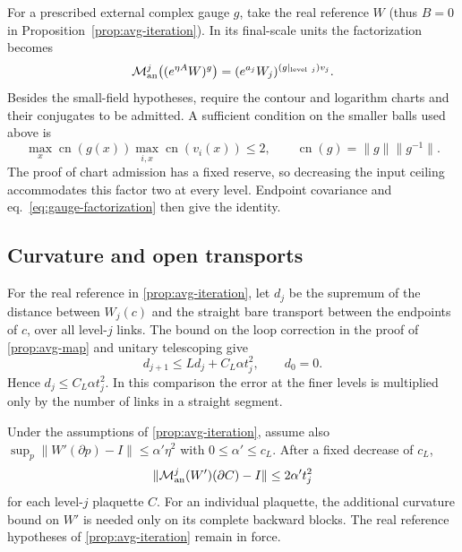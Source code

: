 \documentclass[11pt,letterpaper,reqno]{amsart}
\makeatletter
\numberwithin{equation}{section}
\renewcommand{\eqref}[1]{\textup{eq.~\ref{#1}}}
\theoremstyle{definition}
\newcommand{\ms@minorstart}{%
  \pushQED{\qed}\renewcommand{\qedsymbol}{$\blacksquare$}}
\newenvironment{proposition}[1][]{\ms@minorstart\ms@proposition[#1]}
  {\popQED\endms@proposition}
\theoremstyle{remark}
\makeatother
\begin{document}
For a prescribed external complex gauge $g$, take the real reference
$W$ (thus $B=0$ in Proposition~\ref{prop:avg-iteration}). In its
final-scale units the factorization becomes
\begin{equation}\label{eq:avg-external-gauge}
 \mathcal M_{\rm an}^j\bigl((e^{\eta A}W)^g\bigr)
       =(e^{a_j}W_j)^{(g|_{\mathrm{level}\ j})v_j}.
\end{equation}
Besides the small-field hypotheses, require the contour and logarithm
charts and their conjugates to be admitted. A sufficient condition on
the smaller balls used above is
\[
 \max_x\operatorname{cn}(g(x))\max_{i,x}\operatorname{cn}(v_i(x))\le2,
 \qquad \operatorname{cn}(g)=\|g\|\|g^{-1}\|.
\]
The proof of chart admission has a fixed reserve, so decreasing the
input ceiling accommodates this factor two at every level. Endpoint
covariance and \eqref{eq:gauge-factorization} then give the identity.

\subsection{Curvature and open transports}

For the real reference in \cref{prop:avg-iteration}, let \(d_j\) be
the supremum of the distance between \(W_j(c)\) and the straight
bare transport between the endpoints of \(c\), over all level-\(j\)
links. The bound on the loop correction in the proof of
\cref{prop:avg-map} and unitary telescoping give
\[
 d_{j+1}\leq Ld_j+C_L\alpha t_j^2,\qquad d_0=0.
\]
Hence \(d_j\leq C_L\alpha t_j^2\). In this comparison the error
at the finer levels is multiplied only by the number of links
in a straight segment.

\begin{proposition}[Complex curvature at its own scale]\label{prop:avg-complex-curvature}
Under the assumptions of \cref{prop:avg-iteration}, assume also
\(\sup_p\|W'(\partial p)-I\|\leq\alpha'\eta^2\) with
\(0\leq\alpha'\leq c_L\). After a fixed decrease of \(c_L\),
\[
 \|\mathcal M_{\rm an}^j(W')(\partial C)-I\|
         \leq 2\alpha't_j^2
\]
for each level-\(j\) plaquette \(C\).
For an individual plaquette, the additional curvature bound on
\(W'\) is needed only on its complete backward blocks. The real
reference hypotheses of \cref{prop:avg-iteration} remain in force.
\end{proposition}
\end{document}
